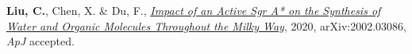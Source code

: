 


\begin{cvpubs}


\cvpub
{ %
\begin{cvitems}
\item {\textbf{Liu, C.}, Chen, X. \& Du, F., \href{https://arxiv.org/pdf/2002.03086v2.pdf}{\textit{Impact of an Active Sgr A* on the Synthesis of Water and Organic Molecules Throughout the Milky Way}}, 2020, arXiv:2002.03086, \textit{ApJ} accepted.}
\end{cvitems}
}


\end{cvpubs}